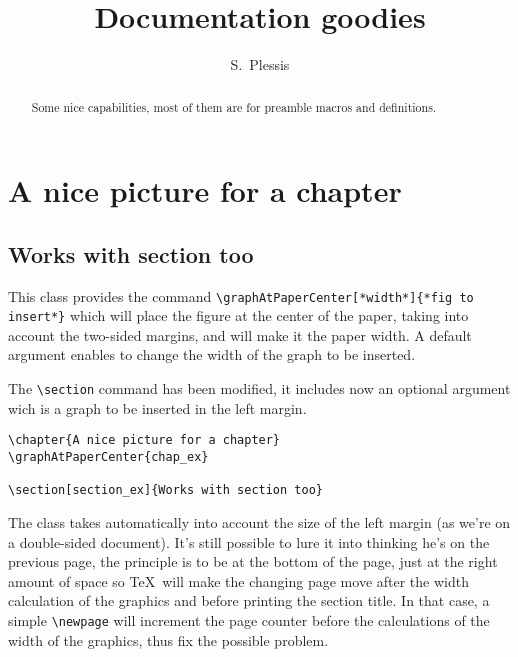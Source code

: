 \documentclass{documentation}
\makeatletter
\def\maketitle{%
\begin{titlepage}
\centering
{\Huge\@title}\vskip0.5ex
{\Large\@author}\vskip0.5ex
{version~\theversion}\vskip1ex
\texttt{[image: title\_graph]}
\setcounter{page}{-1}
\end{titlepage}
}
\makeatother
\begin{document}
\title{Documentation goodies}
\author{S.~Plessis}
\maketitle

\begin{abstract}
Some nice capabilities, most of them are for
preamble macros and definitions.
\end{abstract}

\tableofcontents

\chapter{A nice picture for a chapter}

\section[section_ex]{Works with section too}

This class provides the command \verb!\graphAtPaperCenter[*width*]{*fig to insert*}! which
will place the figure at the center of the paper, taking into
account the two-sided margins, and will make it the paper width. A default
argument enables to change the width of the graph to be inserted.

The \verb!\section! command has been modified, it includes now an optional
argument wich is a graph to be inserted in the left margin.

\begin{verbatim}
\chapter{A nice picture for a chapter}
\graphAtPaperCenter{chap_ex}

\section[section_ex]{Works with section too}
\end{verbatim}

The class takes automatically into account the size
of the left margin (as we're on a double-sided document). It's still
possible to lure it into thinking he's on the previous page, the
principle is to be at the bottom of the page, just at the right
amount of space so \TeX\ will make the changing page move after
the width calculation of the graphics and before printing
the section title. 
In that case, a simple \verb!\newpage! will increment the page
counter before the calculations of the width of the graphics,
thus fix the possible problem.
\end{document}
